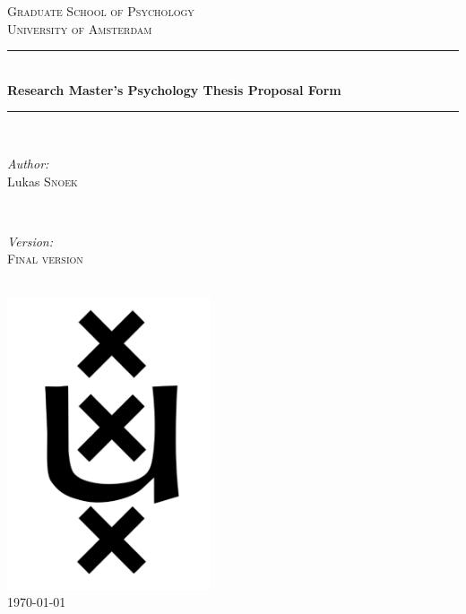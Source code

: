 \documentclass[12pt,a4paper]{article}\usepackage[]{graphicx}\usepackage[]{color}
\begin{document}
\begin{titlepage}

\newcommand{\HRule}{\rule{\linewidth}{0.5mm}} 
\center 

\textsc{\LARGE Graduate School of Psychology}\\[1cm] 
\textsc{\Large University of Amsterdam}\\[1cm]

\HRule \\[0.4cm]
{ \huge \bfseries Research Master's Psychology Thesis Proposal Form}\\[0.4cm] 
\HRule \\[1.5cm]
 
\begin{minipage}{0.4\textwidth}
\begin{flushleft} \large
\emph{Author:}\\
Lukas \textsc{Snoek} 
\end{flushleft}
\end{minipage}
~
\begin{minipage}{0.4\textwidth}
\begin{flushright} \large
\emph{Version:} \\
\textsc{Final version} 
\end{flushright}
\end{minipage}\\[1cm]

\includegraphics[width=60mm]{uva_logo_inv}\\[1cm] 

{\large \today}\\[2cm]

\vfill 

\end{titlepage}
\end{document}

